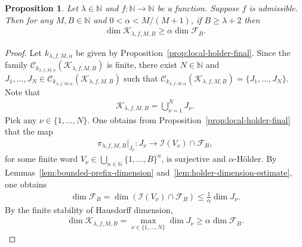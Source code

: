 \documentclass[10pt,a4paper]{amsart}
\newtheorem{prop}{Proposition}
\begin{document}
\begin{prop}
\label{prop:dimension-lower-final}
Let $\lambda\in\mathbb{N}$ and $f:\mathbb{N}\to\mathbb{N}$ be a function. Suppose $f$ is admissible. Then for any $M,B\in\mathbb{N}$ and $0<\alpha<M/(M+1)$, if $B\geq \lambda+2$ then
\begin{align*}
    \dim{\mathcal{K}_{\lambda,f,M,B}}
    \geq \alpha\dim{\mathcal{F}_B}.
\end{align*}
\end{prop}
\begin{proof}
Let $k_{\lambda,f,M,\alpha}$ be given by Proposition~\ref{prop:local-holder-final}. Since the family $\mathscr{C}_{k_{\lambda,f,M,\alpha}}(\mathcal{K}_{\lambda,f,M,B})$ is finite, there exist $N\in\mathbb{N}$ and $J_1,\dots,J_N\in\mathscr{C}_{k_{\lambda,f,M,\alpha}}(\mathcal{K}_{\lambda,f,M,B})$ such that $\mathscr{C}_{k_{\lambda,f,M,\alpha}}(\mathcal{K}_{\lambda,f,M,B})=\{J_1,\dots,J_N\}$. Note that
\begin{align*}
    \mathcal{K}_{\lambda,f,M,B}=\bigcup_{\nu=1}^N J_\nu.
\end{align*}
Pick any $\nu\in\{1,\ldots,N\}$. One obtains from Proposition~\ref{prop:local-holder-final} that the map
\begin{align*}
    \pi_{\lambda,f,M,B}|_{J_\nu}:
    J_\nu\to \mathcal{I}\!\left(V_\nu\right)\cap \mathcal{F}_B,
\end{align*}
for some finite word $V_\nu\in\bigcup_{n\in\mathbb{N}}\{1,\ldots,B\}^n$, is surjective and $\alpha$-H\"older. By Lemmas~\ref{lem:bounded-prefix-dimension} and~\ref{lem:holder-dimension-estimate}, one obtains
\begin{align*}
    \dim{\mathcal{F}_B}
    =\dim{\left(\mathcal{I}\!\left(V_\nu\right)\cap \mathcal{F}_B\right)}
    \leq\frac{1}{\alpha}\dim{J_\nu}.
\end{align*}
By the finite stability of Hausdorff dimension, 
\begin{align*}
    \dim{\mathcal{K}_{\lambda,f,M,B}}
    = \max_{\nu\in\{1,\ldots,N\}}\dim{J_\nu}
    \geq \alpha\dim{\mathcal{F}_B}.
\end{align*}
\end{proof}
\end{document}
